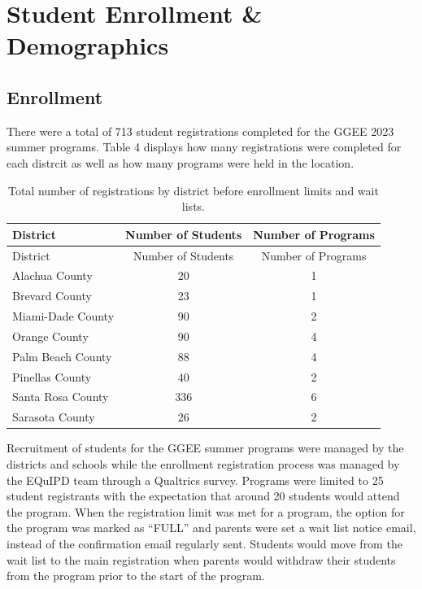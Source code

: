 \documentclass[
]{article}
\begin{document}
\hypertarget{student-enrollment-demographics}{%
\section{Student Enrollment \&
Demographics}\label{student-enrollment-demographics}}

\hypertarget{enrollment}{%
\subsection{Enrollment}\label{enrollment}}

There were a total of 713 student registrations completed for the GGEE
2023 summer programs. Table 4 displays how many registrations were
completed for each distrcit as well as how many programs were held in
the location.

\begin{longtable}[]{@{}lcc@{}}
\caption{Total number of registrations by district before enrollment
limits and wait lists.}\tabularnewline
\toprule\noalign{}
District & Number of Students & Number of Programs \\
\midrule\noalign{}
\endfirsthead
\toprule\noalign{}
District & Number of Students & Number of Programs \\
\midrule\noalign{}
\endhead
\bottomrule\noalign{}
\endlastfoot
Alachua County & 20 & 1 \\
Brevard County & 23 & 1 \\
Miami-Dade County & 90 & 2 \\
Orange County & 90 & 4 \\
Palm Beach County & 88 & 4 \\
Pinellas County & 40 & 2 \\
Santa Rosa County & 336 & 6 \\
Sarasota County & 26 & 2 \\
\end{longtable}

Recruitment of students for the GGEE summer programs were managed by the
districts and schools while the enrollment registration process was
managed by the EQuIPD team through a Qualtrics survey. Programs were
limited to 25 student registrants with the expectation that around 20
students would attend the program. When the registration limit was met
for a program, the option for the program was marked as ``FULL'' and
parents were set a wait list notice email, instead of the confirmation
email regularly sent. Students would move from the wait list to the main
registration when parents would withdraw their students from the program
prior to the start of the program.
\end{document}
